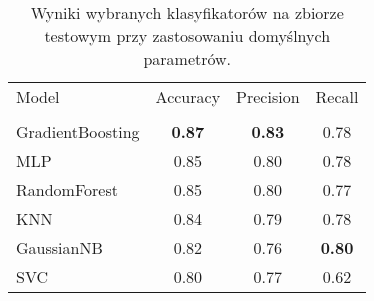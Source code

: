\begin{table}[t]
\centering
\caption{Wyniki wybranych klasyfikatorów na zbiorze testowym przy zastosowaniu domyślnych parametrów.}
\label{tab:base-results}
\begin{tabular}{lccc}
\toprule
Model & Accuracy & Precision & Recall \\
 &  &  &  \\
\midrule
GradientBoosting & \textbf{0.87} & \textbf{0.83} & 0.78 \\
MLP & 0.85 & 0.80 & 0.78 \\
RandomForest & 0.85 & 0.80 & 0.77 \\
KNN & 0.84 & 0.79 & 0.78 \\
GaussianNB & 0.82 & 0.76 & \textbf{0.80} \\
SVC & 0.80 & 0.77 & 0.62 \\
\bottomrule
\end{tabular}
\end{table}
